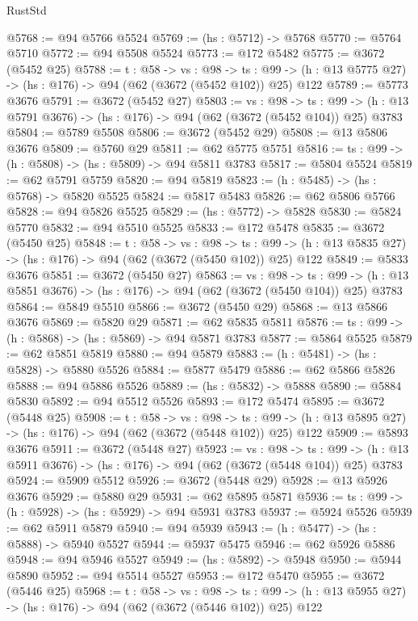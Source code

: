 \begin{lexlean}{RustStd}
\begin{coremodule}
{\begin{coremodule}
{{{{{{{{{@5768 := @94 @5766 @5524
@5769 := (hs : @5712) -> @5768
@5770 := @5764 @5710
@5772 := @94 @5508 @5524
@5773 := @172 @5482
@5775 := @3672 (@5452 @25)
@5788 := {t : @58} ->
  {vs : @98} ->
  {ts : @99} -> (h : @13 @5775 @27) -> (hs : @176) -> @94 (@62 (@3672 (@5452 @102)) @25) @122
@5789 := @5773 @3676
@5791 := @3672 (@5452 @27)
@5803 := {vs : @98} ->
  {ts : @99} -> (h : @13 @5791 @3676) -> (hs : @176) -> @94 (@62 (@3672 (@5452 @104)) @25) @3783
@5804 := @5789 @5508
@5806 := @3672 (@5452 @29)
@5808 := @13 @5806 @3676
@5809 := @5760 @29
@5811 := @62 @5775 @5751
@5816 := {ts : @99} -> (h : @5808) -> (hs : @5809) -> @94 @5811 @3783
@5817 := @5804 @5524
@5819 := @62 @5791 @5759
@5820 := @94 @5819
@5823 := (h : @5485) -> (hs : @5768) -> @5820 @5525
@5824 := @5817 @5483
@5826 := @62 @5806 @5766
@5828 := @94 @5826 @5525
@5829 := (hs : @5772) -> @5828
@5830 := @5824 @5770
@5832 := @94 @5510 @5525
@5833 := @172 @5478
@5835 := @3672 (@5450 @25)
@5848 := {t : @58} ->
  {vs : @98} ->
  {ts : @99} -> (h : @13 @5835 @27) -> (hs : @176) -> @94 (@62 (@3672 (@5450 @102)) @25) @122
@5849 := @5833 @3676
@5851 := @3672 (@5450 @27)
@5863 := {vs : @98} ->
  {ts : @99} -> (h : @13 @5851 @3676) -> (hs : @176) -> @94 (@62 (@3672 (@5450 @104)) @25) @3783
@5864 := @5849 @5510
@5866 := @3672 (@5450 @29)
@5868 := @13 @5866 @3676
@5869 := @5820 @29
@5871 := @62 @5835 @5811
@5876 := {ts : @99} -> (h : @5868) -> (hs : @5869) -> @94 @5871 @3783
@5877 := @5864 @5525
@5879 := @62 @5851 @5819
@5880 := @94 @5879
@5883 := (h : @5481) -> (hs : @5828) -> @5880 @5526
@5884 := @5877 @5479
@5886 := @62 @5866 @5826
@5888 := @94 @5886 @5526
@5889 := (hs : @5832) -> @5888
@5890 := @5884 @5830
@5892 := @94 @5512 @5526
@5893 := @172 @5474
@5895 := @3672 (@5448 @25)
@5908 := {t : @58} ->
  {vs : @98} ->
  {ts : @99} -> (h : @13 @5895 @27) -> (hs : @176) -> @94 (@62 (@3672 (@5448 @102)) @25) @122
@5909 := @5893 @3676
@5911 := @3672 (@5448 @27)
@5923 := {vs : @98} ->
  {ts : @99} -> (h : @13 @5911 @3676) -> (hs : @176) -> @94 (@62 (@3672 (@5448 @104)) @25) @3783
@5924 := @5909 @5512
@5926 := @3672 (@5448 @29)
@5928 := @13 @5926 @3676
@5929 := @5880 @29
@5931 := @62 @5895 @5871
@5936 := {ts : @99} -> (h : @5928) -> (hs : @5929) -> @94 @5931 @3783
@5937 := @5924 @5526
@5939 := @62 @5911 @5879
@5940 := @94 @5939
@5943 := (h : @5477) -> (hs : @5888) -> @5940 @5527
@5944 := @5937 @5475
@5946 := @62 @5926 @5886
@5948 := @94 @5946 @5527
@5949 := (hs : @5892) -> @5948
@5950 := @5944 @5890
@5952 := @94 @5514 @5527
@5953 := @172 @5470
@5955 := @3672 (@5446 @25)
@5968 := {t : @58} ->
  {vs : @98} ->
  {ts : @99} -> (h : @13 @5955 @27) -> (hs : @176) -> @94 (@62 (@3672 (@5446 @102)) @25) @122
}}}}}}}}}
\end{coremodule}}
\end{coremodule}
\end{lexlean}
